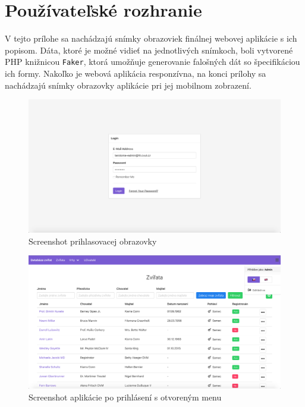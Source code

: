 \chapter{Používateľské rozhranie}
V tejto prílohe sa nachádzajú snímky obrazoviek finálnej webovej aplikácie s ich popisom. Dáta, ktoré je možné vidieť na jednotlivých snímkoch, boli vytvorené PHP knižnicou \texttt{Faker}, ktorá umožňuje generovanie falošných dát so špecifikáciou ich formy. Nakoľko je webová aplikácia responzívna, na konci prílohy sa nachádzajú snímky obrazovky aplikácie pri jej mobilnom zobrazení.

\vspace*{\fill}

\begin{figure}[H]
	\includegraphics[width=1.0\textwidth]{media/priloha/vseobecne/1.png}
	\caption{Screenshot prihlasovacej obrazovky}
\end{figure}

\begin{figure}[H]
	\includegraphics[width=1.0\textwidth]{media/priloha/vseobecne/2.png}
	\caption{Screenshot aplikácie po prihlásení s otvoreným menu}
\end{figure}

